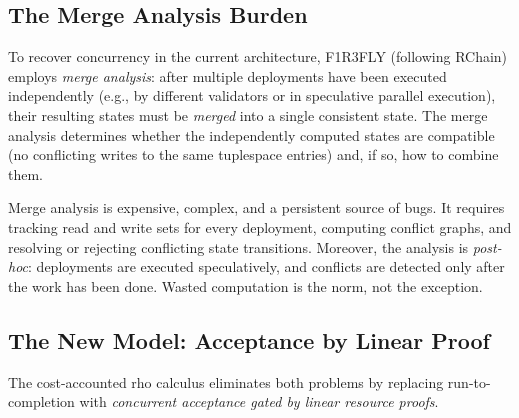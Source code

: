 \documentclass[11pt,a4paper]{article}
\begin{document}
\subsection{The Merge Analysis Burden}
\label{sec:merge-burden}

To recover concurrency in the current architecture, F1R3FLY
(following RChain) employs \emph{merge analysis}: after
multiple deployments have been executed independently (e.g.,
by different validators or in speculative parallel
execution), their resulting states must be \emph{merged}
into a single consistent state.  The merge analysis
determines whether the independently computed states are
compatible (no conflicting writes to the same tuplespace
entries) and, if so, how to combine them.

Merge analysis is expensive, complex, and a persistent
source of bugs.  It requires tracking read and write sets
for every deployment, computing conflict graphs, and
resolving or rejecting conflicting state transitions.
Moreover, the analysis is \emph{post-hoc}: deployments are
executed speculatively, and conflicts are detected only
after the work has been done.  Wasted computation is the
norm, not the exception.

\subsection{The New Model: Acceptance by Linear Proof}
\label{sec:new-model}

The cost-accounted rho calculus eliminates both problems by
replacing run-to-completion with \emph{concurrent acceptance
gated by linear resource proofs}.
\end{document}
